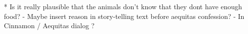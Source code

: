 * Is it really plausible that the animals don't know that they dont have enough food?
- Maybe insert reason in story-telling text before aequitas confession?
- In Cinnamon / Aequitas dialog ?